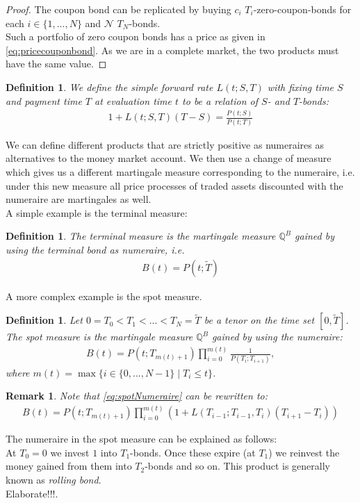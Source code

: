 \documentclass[12pt]{article}
\newtheorem{remark}[theorem]{Remark}
\newtheorem{definition}[theorem]{Definition}
\begin{document}
	\begin{proof}
		The coupon bond can be replicated by buying $c_i$ $T_i$-zero-coupon-bonds for each $i\in \{1, ...,N\}$ and $\mathcal{N}$  $T_N$-bonds.\\
		Such a portfolio of zero coupon bonds has a price as given in \cref{eq:pricecouponbond}. As we are in a complete market, the two products must have the same value.
	\end{proof}
	\begin{definition}\label{def:simpleFR}
		We define the \emph{simple forward rate} $L(t;S,T)$ with fixing time $S$ and payment time $T$ at evaluation time $t$ to be a relation of $S$- and $T$-bonds:
		\begin{align}
			1 + L(t;S,T)(T - S) = \frac{P(t;S)}{P(t;T)}
		\end{align}
	\end{definition}
	We can define different products that are strictly positive as numeraires as alternatives to the money market account. We then use a change of measure which gives us a different martingale measure corresponding to the numeraire, i.e. under this new measure all price processes of traded assets discounted with the numeraire are martingales as well.\\
	A simple example is the terminal measure:
	\begin{definition}
		The \emph{terminal measure} is the martingale measure $\mathbb{Q}^B$ gained by using the terminal bond as numeraire, i.e. 
		\begin{align}\label{eq:terminalNumeraire}
			B(t) = P(t;\tilde{T})
		\end{align}
	\end{definition}
	A more complex example is the spot measure.
	\begin{definition}
		Let $0 = T_0 < T_1 < ... < T_N = \tilde{T}$ be a tenor on the time set $[0,\tilde{T}]$.\\
		The \emph{spot measure} is the martingale measure $\mathbb{Q}^B$ gained by using the numeraire:
		\begin{align}\label{eq:spotNumeraire}
			B(t) = P(t;T_{m(t)+1})\prod_{i=0}^{m(t)}\frac{1}{P(T_{i};T_{i+1})},
		\end{align}
		where $m(t) = \max\{i \in \{0, ..., N-1\} \; | \; T_i \le t \}$.
	\end{definition}
	\begin{remark}
		Note that \cref{eq:spotNumeraire} can be rewritten to:
		\begin{align}\label{eq:spotNumeraireAlt}
			B(t) = P(t;T_{m(t)+1})\prod_{i=0}^{m(t)}\left(1 + L\left(T_{i-1};T_{i-1},T_i\right)\left(T_{i+1}-T_i\right)\right)
		\end{align}
	\end{remark}
	The numeraire in the spot measure can be explained as follows:\\
	At $T_0 = 0$ we invest $1$ into $T_1$-bonds. Once these expire (at $T_1$) we reinvest the money gained from them into $T_2$-bonds and so on.
	This product is generally known as \emph{rolling bond}.\\
	\color{red}Elaborate!!!\color{black}. 
	
\end{document}

